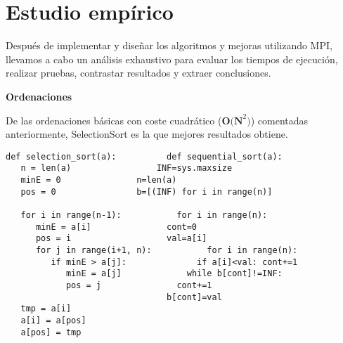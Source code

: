 \chapter{Estudio empírico}

Después de implementar y diseñar los algoritmos y mejoras utilizando MPI, llevamos a cabo un análisis exhaustivo para evaluar los tiempos de ejecución, realizar pruebas, contrastar resultados y extraer conclusiones.\newline

\textbf{Ordenaciones}\newline

De las ordenaciones básicas con coste cuadrático ($\textbf{O(N}^2\textbf{)}$) comentadas anteriormente, SelectionSort es la que mejores resultados obtiene.

\lstset{language=python, breaklines=true, basicstyle=\footnotesize}
\begin{lstlisting}[frame=single]
def selection_sort(a):			def sequential_sort(a):
   n = len(a)				  INF=sys.maxsize
   minE = 0				  n=len(a)
   pos = 0			  	  b=[(INF) for i in range(n)]  
   
   for i in range(n-1):			  for i in range(n):
      minE = a[i]			    cont=0
      pos = i				    val=a[i]
      for j in range(i+1, n):		    for i in range(n):  
         if minE > a[j]:		      if a[i]<val: cont+=1
            minE = a[j]				while b[cont]!=INF: 
            pos = j				  cont+=1
            					b[cont]=val
   tmp = a[i]
   a[i] = a[pos]
   a[pos] = tmp
	
\end{lstlisting}

